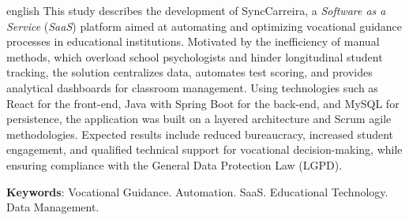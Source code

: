 \begin{resumo}[Abstract]
\begin{otherlanguage*}{english}
    This study describes the development of SyncCarreira, a \textit{Software as a Service} (\textit{SaaS}) platform aimed at automating and optimizing vocational guidance processes in educational institutions. Motivated by the inefficiency of manual methods, which overload school psychologists and hinder longitudinal student tracking, the solution centralizes data, automates test scoring, and provides analytical dashboards for classroom management. Using technologies such as React for the front-end, Java with Spring Boot for the back-end, and MySQL for persistence, the application was built on a layered architecture and Scrum agile methodologies. Expected results include reduced bureaucracy, increased student engagement, and qualified technical support for vocational decision-making, while ensuring compliance with the General Data Protection Law (LGPD).

\vspace{\onelineskip}
\noindent
\textbf{Keywords}: Vocational Guidance. Automation. SaaS. Educational Technology. Data Management.
\end{otherlanguage*}
\end{resumo}
